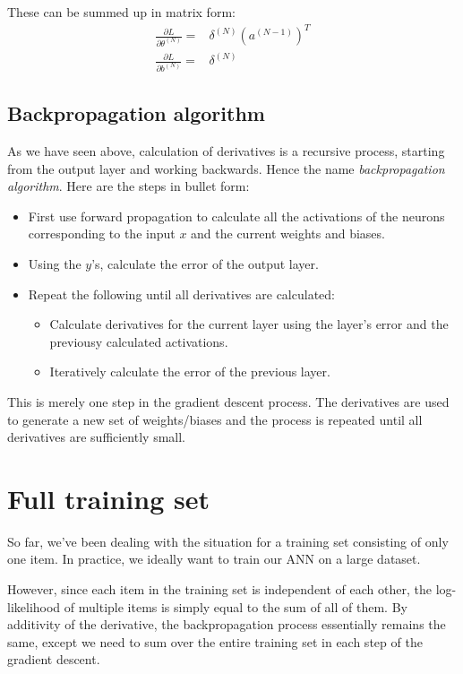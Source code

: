 \documentclass[12pt, a4paper]{article}
\numberwithin{equation}{section}
\begin{document}
These can be summed up in matrix form:
\begin{align}
\label{general_derivative}
\frac{\partial L}{\partial\theta^{(N)}}=&\delta^{(N)}\left(a^{(N-1)}\right)^T\\
\frac{\partial L}{\partial b^{(N)}}=&\delta^{(N)}
\end{align}


\subsection{Backpropagation algorithm}
As we have seen above, calculation of derivatives is a recursive process, starting from the output layer and working backwards. Hence the name \textit{backpropagation algorithm}. Here are the steps in bullet form:
\begin{itemize}
\item First use forward propagation to calculate all the activations of the neurons corresponding to the input $x$ and the current weights and biases.
\item Using the $y$'s, calculate the error of the output layer.
\item Repeat the following until all derivatives are calculated:
\begin{itemize}
\item Calculate derivatives for the current layer using the layer's error and the previousy calculated activations.
\item Iteratively calculate the error of the previous layer.
\end{itemize}
\end{itemize}
This is merely one step in the gradient descent process. The derivatives are used to generate a new set of weights/biases and the process is repeated until all derivatives are sufficiently small.

\section{Full training set}
So far, we've been dealing with the situation for a training set consisting of only one item. In practice, we ideally want to train our ANN on a large dataset.

However, since each item in the training set is independent of each other, the log-likelihood of multiple items is simply equal to the sum of all of them. By additivity of the derivative, the backpropagation process essentially remains the same, except we need to sum over the entire training set in each step of the gradient descent.
\end{document}
